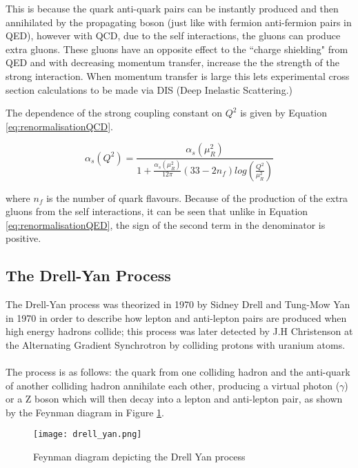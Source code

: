 \documentclass[11pt,oneside,a4paper]{article}
\begin{document}
This is because the quark anti-quark pairs can be instantly produced and then annihilated by the propagating boson (just like with fermion anti-fermion pairs in QED), however with QCD, due to the self interactions, the gluons can produce extra gluons. These gluons have an opposite effect to the ``charge shielding" from QED and with decreasing momentum transfer, increase the the strength of the strong interaction. When momentum transfer is large this lets experimental cross section calculations to be made via DIS (Deep Inelastic Scattering.)

The dependence of the strong coupling constant on $Q^{2}$ is given by Equation \ref{eq:renormalisationQCD}.

\begin{equation}
\label{eq:renormalisationQCD}
\alpha_{s}(Q^{2}) = \frac{\alpha_{s}(\mu_{R}^{2})}{1+\frac{\alpha_{s}(\mu^{2}_{R})}{12\pi} (33-2n_{f}) log(\frac{Q^{2}}{\mu_{R}^{2}})}
\end{equation}

where $n_{f}$ is the number of quark flavours. Because of the production of the extra gluons from the self interactions, it can be seen that unlike in Equation \ref{eq:renormalisationQED}, the sign of the second term in the denominator is positive.

\subsection{The Drell-Yan Process}



The Drell-Yan process was theorized in 1970 by Sidney Drell and Tung-Mow Yan in 1970 in order to describe how lepton and anti-lepton pairs are produced when high energy hadrons collide; this process was later detected by J.H Christenson at the Alternating Gradient Synchrotron by colliding protons with uranium atoms. 
\paragraph{}
The process is as follows: the quark from one colliding hadron and the anti-quark of another colliding hadron annihilate each other, producing a virtual photon ($\gamma$) or a Z boson which will then decay into a lepton and anti-lepton pair, as shown by the Feynman diagram in Figure \ref{fig:drell_yan}. 

\begin{figure}[htbp]
	\centering
	\texttt{[image: drell\_yan.png]}
	\caption{Feynman diagram depicting the Drell Yan process}
	\label{fig:drell_yan}
\end{figure}
\end{document}
